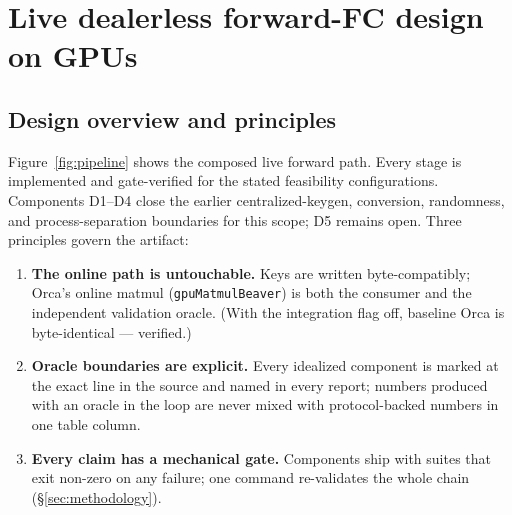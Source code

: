 \documentclass[11pt]{article}
\begin{document}
\section{Live dealerless forward-FC design on GPUs}
\label{sec:design}

\subsection{Design overview and principles}
\label{sec:design-overview}

Figure~\ref{fig:pipeline} shows the composed live forward path. Every stage is
implemented and gate-verified for the stated feasibility configurations.
Components D1--D4 close the earlier centralized-keygen, conversion, randomness,
and process-separation boundaries for this scope; D5 remains open. Three
principles govern the artifact:

\begin{enumerate}
\item \textbf{The online path is untouchable.} Keys are written
  byte-compatibly; Orca's online matmul (\texttt{gpuMatmulBeaver}) is both
  the consumer and the independent validation oracle. (With the integration flag off, baseline
  Orca is byte-identical --- verified.)
\item \textbf{Oracle boundaries are explicit.} Every idealized component is
  marked at the exact line in the source and named in every report; numbers
  produced with an oracle in the loop are never mixed with protocol-backed
  numbers in one table column.
\item \textbf{Every claim has a mechanical gate.} Components ship with
  suites that exit non-zero on any failure; one command re-validates the whole
  chain (\S\ref{sec:methodology}).
\end{enumerate}
\end{document}
